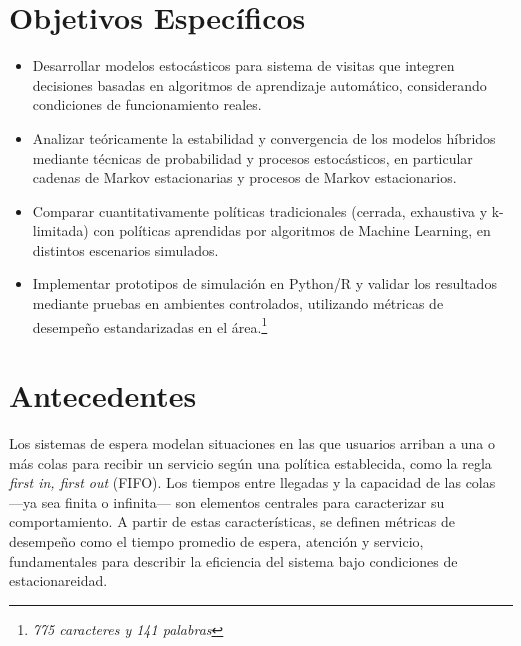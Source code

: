\documentclass[12pt]{article}
\begin{document}
\section{Objetivos Específicos}
\begin{itemize}
  \item Desarrollar modelos estocásticos para sistema de visitas que integren decisiones basadas en algoritmos de aprendizaje automático, considerando condiciones de funcionamiento reales.
  
  \item Analizar teóricamente la estabilidad y convergencia de los modelos híbridos mediante técnicas de probabilidad y procesos estocásticos, en particular cadenas de Markov estacionarias y procesos de Markov estacionarios.
  
  \item Comparar cuantitativamente políticas tradicionales (cerrada, exhaustiva y k-limitada) con políticas aprendidas por algoritmos de Machine Learning, en distintos escenarios simulados.
  
  \item Implementar prototipos de simulación en Python/R y validar los resultados mediante pruebas en ambientes controlados, utilizando métricas de desempeño estandarizadas en el área.\footnote{\textit{775 caracteres y 141 palabras}}
\end{itemize}

\section{Antecedentes}

Los sistemas de espera modelan situaciones en las que usuarios arriban a una o más colas para recibir un servicio según una política establecida, como la regla \textit{first in, first out} (FIFO). Los tiempos entre llegadas y la capacidad de las colas —ya sea finita o infinita— son elementos centrales para caracterizar su comportamiento. A partir de estas características, se definen métricas de desempeño como el tiempo promedio de espera, atención y servicio, fundamentales para describir la eficiencia del sistema bajo condiciones de estacionareidad.
\end{document}
